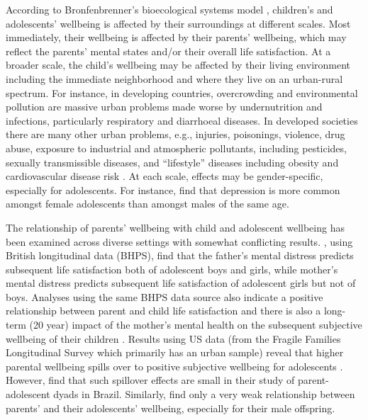\documentclass[10pt, letterpaper]{article}
\begin{document}
\begin{spacing}{1.4}
According to Bronfenbrenner's bioecological systems model
\citep{bronfenbrenner2007}, children's and adolescents' wellbeing is affected by
their surroundings at different scales. Most immediately, their wellbeing is
affected by their parents' wellbeing, which may reflect the parents' mental
states and/or their overall life satisfaction. At a broader scale, the child's
wellbeing may be affected by their living environment including the immediate
neighborhood and where they live on an urban-rural spectrum. 
 For instance, in developing countries, 
overcrowding and environmental pollution are massive urban problems made worse by
undernutrition and infections, particularly respiratory and diarrhoeal
diseases. In developed societies there are many other urban problems, e.g., injuries,
poisonings, violence, drug abuse, exposure to industrial and atmospheric
pollutants, including pesticides, sexually transmissible diseases, and
``lifestyle'' diseases including obesity and cardiovascular disease risk \citep{gracey2002child}.
At each scale, effects may be gender-specific, especially for adolescents. For
instance, \citet{nolen2016} find that depression is more common amongst female
adolescents than amongst males of the same age.

The relationship of parents' wellbeing with child and adolescent wellbeing has
been examined across diverse settings with somewhat conflicting
results. \citet{powdthavee2008}, using British longitudinal data (BHPS), find that the
father's mental distress predicts subsequent life satisfaction both of
adolescent boys and girls, while mother's mental distress predicts subsequent
life satisfaction of adolescent girls but not of boys. Analyses using the same
BHPS data source also indicate a positive relationship between parent and child
life satisfaction \citep{clair2012relationship} and there is also a long-term
(20 year) impact of the mother's mental health on the subsequent subjective
wellbeing of their children \citep{layard2014,clark2019}. Results using US data
(from the Fragile Families Longitudinal Survey which primarily has an urban
sample) reveal that higher parental wellbeing spills over to positive subjective
wellbeing for adolescents \citep{coles2022,park2024}.
However, \citet{bedin2014dyadic}  find that such spillover effects are small in
their study of parent-adolescent dyads in Brazil. Similarly,
\citet{casas2008does, casas2012testing}  find only a very weak relationship between parents' and their
adolescents' wellbeing, especially for their male offspring.


\end{spacing}
\end{document}

